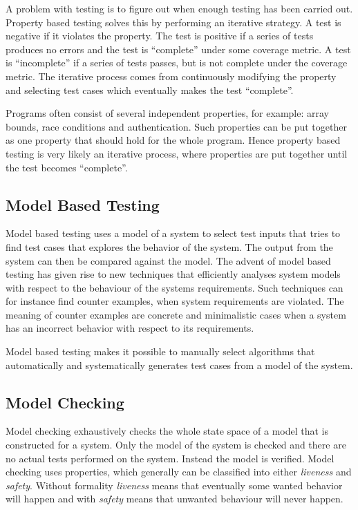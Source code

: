 A problem with testing is to figure out when enough testing has been
carried out. Property based testing solves this by performing an
iterative strategy. A test is negative if it violates the
property. The test is positive if a series of tests produces no errors
and the test is ``complete'' under some coverage metric. A test is
``incomplete'' if a series of tests passes, but is not complete
under the coverage metric. The iterative process comes from
continuously modifying the property and selecting test cases which
eventually makes the test
``complete''. \cite{Fink:1997:PTN:263244.263267}

Programs often consist of several independent properties, for example:
array bounds, race conditions and authentication. Such properties can
be put together as one property that should hold for the whole
program. Hence property based testing is very likely an iterative
process, where properties are put together until the test becomes
``complete''. \cite{Fink:1997:PTN:263244.263267}

\subsection{Model Based Testing}
Model based testing uses a model of a system to select test inputs
that tries to find test cases that explores the behavior of the
system. The output from the system can then be compared against the
model. The advent of model based testing has given rise to new
techniques that efficiently analyses system models with respect to the
behaviour of the systems requirements. Such techniques can for
instance find counter examples, when system requirements are
violated. The meaning of counter examples are concrete and
minimalistic cases when a system has an incorrect behavior with
respect to its requirements.
\cite{Meinke:ModelbasedTesting}

Model based testing makes it possible to manually select algorithms
that automatically and systematically generates test cases from a
model of the system.
\cite{Schieferdecker:ModelbasedTesting}

\subsection{Model Checking}
Model checking exhaustively checks the whole state space of a model that is
constructed for a system. Only the model of the system is checked and there are
no actual tests performed on the system. Instead the model is verified.  Model
checking uses properties, which generally can be classified into either
\emph{liveness} and \emph{safety}. Without formality \emph{liveness} means that eventually
some wanted behavior will happen and with \emph{safety} means that unwanted
behaviour will never happen. \cite{MODELCHECKING:SOFTWARE}

